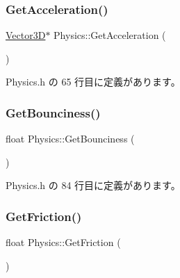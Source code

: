 \mbox{\label{class_physics_aee9ce4604f63dbdcab07ded4d0174989}} 
\subsubsection{\texorpdfstring{Get\+Acceleration()}{GetAcceleration()}}
{\footnotesize\ttfamily \mbox{\hyperlink{class_vector3_d}{Vector3D}}$\ast$ Physics\+::\+Get\+Acceleration (\begin{DoxyParamCaption}{ }\end{DoxyParamCaption})\hspace{0.3cm}{\ttfamily [inline]}}



 Physics.\+h の 65 行目に定義があります。

\mbox{\label{class_physics_a5126745b31c45267ae516cc09a82fb5d}} 
\subsubsection{\texorpdfstring{Get\+Bounciness()}{GetBounciness()}}
{\footnotesize\ttfamily float Physics\+::\+Get\+Bounciness (\begin{DoxyParamCaption}{ }\end{DoxyParamCaption})\hspace{0.3cm}{\ttfamily [inline]}}



 Physics.\+h の 84 行目に定義があります。

\mbox{\label{class_physics_aee1fe26db953d0712b2a26ce9d1db0d9}} 
\subsubsection{\texorpdfstring{Get\+Friction()}{GetFriction()}}
{\footnotesize\ttfamily float Physics\+::\+Get\+Friction (\begin{DoxyParamCaption}{ }\end{DoxyParamCaption})\hspace{0.3cm}{\ttfamily [inline]}}



